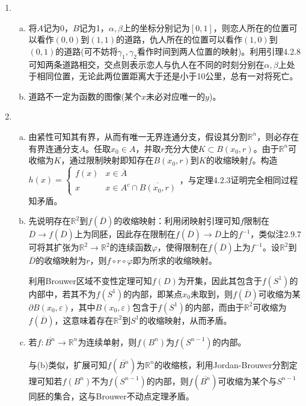 \documentclass[a4paper,UTF8,fontset=windows]{ctexart}
\begin{document}
\begin{enumerate}[(1)]
    \item
    \begin{enumerate}[(a)]
    \item
    将$A$记为0，$B$记为1，$\alpha,\beta$上的坐标分别记为$[0,1]$，则恋人所在的位置可以看作$(0,0)$到$(1,1)$的道路，仇人所在的位置可以看作$(1,0)$到$(0,1)$的道路(可不妨将$\gamma_1,\gamma_2$看作时间到两人位置的映射)。利用引理4.2.8可知两条道路相交，交点则表示恋人与仇人在不同的时刻分别在$\alpha,\beta$上处于相同位置，无论此两位置距离大于还是小于10公里，总有一对将死亡。

    \item
    道路不一定为函数的图像(某个$x$未必对应唯一的$y$)。
    \end{enumerate}

    \item
    \begin{enumerate}[(a)]
    \item
    由紧性可知其有界，从而有唯一无界连通分支，假设其分割$\mathbb{R}^n$，则必存在有界连通分支$A$。任取$x_0\in A$，并取$r$充分大使$K\subset B(x_0,r)$。由于$\mathbb{R}^n$可收缩为$K$，通过限制映射即知存在$\overline{B(x_0,r)}$到$K$的收缩映射$f$。构造$h(x)=\begin{cases}f(x)&x\in\overline{A}\\x&x\in A^c\cap\overline{B(x_0,r)}\end{cases}$，与定理4.2.3证明完全相同过程知矛盾。

    \item
    先说明存在$\mathbb{R}^2$到$f(\overline{D})$的收缩映射：利用闭映射引理可知$f$限制在$\overline{D}\to f(\overline{D})$上为同胚，因此存在限制在$f(\overline{D})\to\overline{D}$上的$f^{-1}$，类似注2.9.7可将其扩张为$\mathbb{R}^2\to\mathbb{R}^2$的连续函数$\varphi$，使得限制在$f(\overline{D})$上为$f^{-1}$。设$\mathbb{R}^2$到$\overline{D}$的收缩映射为$r$，则$f\circ r\circ\varphi$即为所求的收缩映射。

    利用Brouwer区域不变性定理可知$f(D)$为开集，因此其包含于$f(S^1)$的内部中，若其不为$f(S^1)$的内部，即某点$x_0$未取到，则$f(\overline{D})$可收缩为某$\partial B(x_0,\varepsilon)$，其中$B(x_0,\varepsilon)$包含于$f(S^1)$的内部，而由于$\mathbb{R}^2$可收缩为$f(\overline{D})$，这意味着存在$\mathbb{R}^2$到$S^1$的收缩映射，从而矛盾。

    \item
    若$f:\overline{B^n}\to\mathbb{R}^n$为连续单射，则$f(B^n)$为$f(S^{n-1})$的内部。

    与(b)类似，扩展可知$f(\overline{B^n})$为$\mathbb{R}^n$的收缩核，利用Jordan-Brouwer分割定理可知若$f(B^n)$不为$f(S^{n-1})$的内部，则$f(\overline{B^n})$可收缩为某个与$S^{n-1}$同胚的集合，这与Brouwer不动点定理矛盾。
    \end{enumerate}


\end{enumerate}
\end{document}
